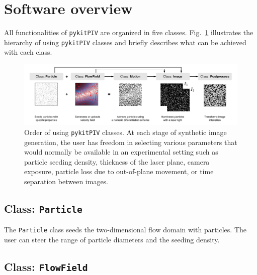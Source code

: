 \documentclass[a4paper,fleqn]{cas-dc}
\begin{document}
\section{Software overview} \label{sec:software}

All functionalities of \texttt{pykitPIV} are organized in five classes.
Fig.~\ref{fig:pykitPIV-overview} illustrates the hierarchy of using \texttt{pykitPIV} classes and briefly describes what can be achieved with each class.



\begin{figure}[t]
\centering
\vspace{-0.4 in}
\includegraphics[width=\textwidth]{pykitPIV-modules.pdf}
\vspace{10 pt}
\caption{\footnotesize Order of using \texttt{pykitPIV} classes. At each stage of synthetic image generation, the user has freedom in selecting various parameters that would normally be available in an experimental setting such as particle seeding density, thickness of the laser plane, camera exposure, particle loss due to out-of-plane movement, or time separation between images.}
\label{fig:pykitPIV-overview}
\end{figure}




\subsection{Class: \texttt{Particle}} \label{sec:class-particle}

The \texttt{Particle} class seeds the two-dimensional flow domain with particles. The user can steer the range of particle diameters and the seeding density.


\subsection{Class: \texttt{FlowField}} \label{sec:class-particle}
\end{document}

